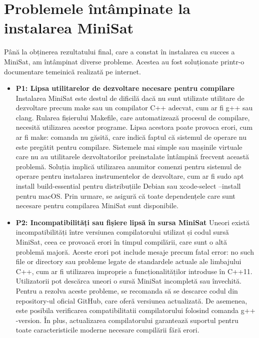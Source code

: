 \documentclass[12pt,a4paper]{report}
\begin{document}
\section{Problemele întâmpinate la instalarea MiniSat}
Până la obținerea rezultatului final, care a constat în instalarea cu succes a MiniSat, am întâmpinat diverse probleme. Acestea au fost soluționate printr-o documentare temeinică realizată pe internet.
 \begin{itemize}
 \item \textbf{P1: Lipsa utilitarelor de dezvoltare necesare pentru compilare } 
 Instalarea MiniSat este destul de dificilă dacă nu sunt utilizate utilitare de dezvoltare precum make sau un compilator C++ adecvat, cum ar fi g++ sau clang. Rularea fișierului Makefile, care automatizează procesul de compilare, necesită utilizarea acestor programe. Lipsa acestora poate provoca erori, cum ar fi make: comanda nu găsită, care indică faptul că sistemul de operare nu este pregătit pentru compilare. Sistemele mai simple sau mașinile virtuale care nu au utilitarele dezvoltatorilor preinstalate întâmpină frecvent această problemă. Soluția implică utilizarea anumitor comenzi pentru sistemul de operare pentru instalarea instrumentelor de dezvoltare, cum ar fi sudo apt install build-essential pentru distribuțiile Debian sau xcode-select --install pentru macOS. Prin urmare, se asigură că toate dependențele care sunt necesare pentru compilarea MiniSat sunt disponibile.

 \item \textbf{P2: Incompatibilități sau fișiere lipsă în sursa MiniSat} 
Uneori există incompatibilități între versiunea compilatorului utilizat și codul sursă MiniSat, ceea ce provoacă erori în timpul compilării, care sunt o altă problemă majoră. Aceste erori pot include mesaje precum fatal error: no such file or directory sau probleme legate de standardele actuale ale limbajului C++, cum ar fi utilizarea improprie a funcționalităților introduse în C++11. Utilizatorii pot descărca uneori o sursă MiniSat incompletă sau învechită. Pentru a rezolva aceste probleme, se recomanda să se descarce codul din repository-ul oficial GitHub, care oferă versiunea actualizată. De asemenea, este posibila verificarea compatibilitatii compilatorului folosind comanda g++ -version. În plus, actualizarea compilatorului garantează suportul pentru toate caracteristicile moderne necesare compilării fără erori.



\end{itemize}
\end{document}
